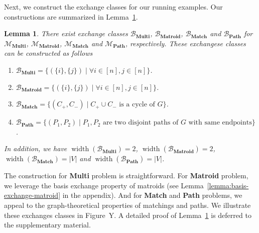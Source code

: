 \documentclass{article}
\newtheorem{lemma}{Lemma}
\newcommand{\M}{\mathcal M}
\newcommand{\B}{\mathcal B}
\DeclareMathOperator{\rank}{width}
\newcommand{\MultiIdent}{\textbf{Multi}\xspace}
\newcommand{\Matroid}{\textbf{Matroid}\xspace}
\newcommand{\Match}{\textbf{Match}\xspace}
\newcommand{\Path}{\textbf{Path}\xspace}
\begin{document}
\begin{spacing}{1.1}
Next, we construct the exchange classes for our running examples. 
Our constructions are summarized in Lemma~\ref{lemma:example-exchange-class}.
\begin{lemma}
There exist exchange classes $\B_{\MultiIdent}$, $\B_{\Matroid}$, $\B_{\Match}$ and $\B_{\Path}$ for $\M_{\MultiIdent}$, $\M_{\Matroid}$, $\M_{\Match}$ and $\M_{\Path}$, respectively. 
These exchangese classes can be constructed as follows
\begin{enumerate}
	\item $\B_{\MultiIdent}=\big\{(\{i\},\{j\})\;|\;\forall i\in [n], j\in [n]\big\}$.
	\item $\B_{\Matroid}=\big\{(\{i\},\{j\})\;|\;\forall i\in [n], j\in [n]\big\}$.
	\item $\B_{\Match}=\big\{(C_+,C_-)\;|\; C_+\cup C_- \text{ is a cycle of }G\big\}$.
	\item $\B_{\Path}=\big\{ (P_1, P_2) \;|\;P_1,P_2\text{ are two disjoint paths of }G\text{ with same endpoints}\big\}$.
\end{enumerate}
In addition, we have $\rank(\B_{\MultiIdent})=2$, $\rank(\B_{\Matroid})=2$, $\rank(\B_{\Match})=|V|$ and $\rank(\B_{\Path})=|V|$.
\label{lemma:example-exchange-class}
\end{lemma}
The  construction for \MultiIdent problem is straightforward. 
For \Matroid problem, we leverage the basis exchange property of matroids (see Lemma~\ref{lemma:basis-exchange-matroid} in the appendix).
And for \Match and \Path problems, we appeal to the graph-theoretical properties of matchings and paths.
We illustrate these  exchanges classes in Figure~Y.
A detailed proof of Lemma~\ref{lemma:example-exchange-class} is deferred to the supplementary material.



\end{spacing}
\end{document}
